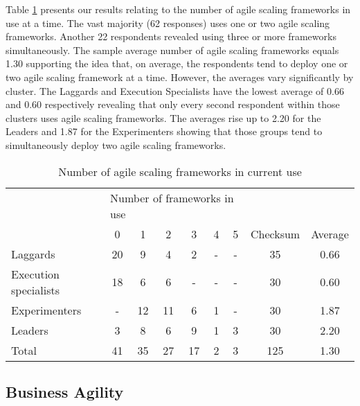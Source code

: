 \documentclass{article}
\begin{document}
Table \ref{tab:number-scaling-frameworks} presents our results relating to the number of agile scaling frameworks in use at a time. The vast majority (62 responses) uses one or two agile scaling frameworks. Another 22 respondents revealed using three or more frameworks simultaneously. The sample average number of agile scaling frameworks equals 1.30 supporting the idea that, on average, the respondents tend to deploy one or two agile scaling framework at a time. However, the averages vary significantly by cluster. The Laggards and Execution Specialists have the lowest average of 0.66 and 0.60 respectively revealing that only every second respondent within those clusters uses agile scaling frameworks. The averages rise up to 2.20 for the Leaders and 1.87 for the Experimenters showing that those groups tend to simultaneously deploy two agile scaling frameworks.
%
\begin{table}[hbt]
 \small
 \caption{Number of agile scaling frameworks in current use}
  \centering
  \begin{tabular}{lcccccccc}
    & \multicolumn{6}{l}{Number of frameworks in use} \\
    \cmidrule{2-7}
    & 0 & 1 & 2 & 3 & 4 & 5 & Checksum & Average \\
    \midrule
    Laggards & 20 & 9 & 4 & 2 & - & - & 35 & 0.66 \\
    Execution specialists & 18 & 6 & 6 & - & - & - & 30 & 0.60 \\
    Experimenters & - & 12 & 11 & 6 & 1 & - & 30 & 1.87 \\
    Leaders & 3 & 8 & 6 & 9 & 1 & 3 & 30 & 2.20 \\
    \midrule
    Total & 41 & 35 & 27 & 17 & 2 & 3 & 125 & 1.30 \\
  \end{tabular}
  \label{tab:number-scaling-frameworks}
 \end{table}


\subsection{Business Agility}


\end{document}
